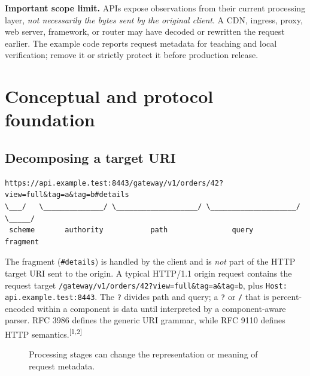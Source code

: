 \documentclass[10pt,letterpaper,oneside]{article}
\newcommand{\refs}[1]{\textsuperscript{\color{blue}[#1]}}
\newcommand{\code}[1]{\texttt{#1}}
\begin{document}
\begin{riskbox}
\textbf{Important scope limit.} APIs expose observations from their current processing layer, \emph{not necessarily the bytes sent by the original client}. A CDN, ingress, proxy, web server, framework, or router may have decoded or rewritten the request earlier. The example code reports request metadata for teaching and local verification; remove it or strictly protect it before production release.
\end{riskbox}
\clearpage
{}
\section{Conceptual and protocol foundation}
\subsection{Decomposing a target URI}
\begin{lstlisting}[language=Plain]
https://api.example.test:8443/gateway/v1/orders/42?view=full&tag=a&tag=b#details
\___/   \______________/ \___________________/ \____________________/ \_____/
 scheme       authority           path               query         fragment
\end{lstlisting}
The fragment (\code{\#details}) is handled by the client and is \emph{not} part of the HTTP target URI sent to the origin. A typical HTTP/1.1 origin request contains the request target \code{/gateway/v1/orders/42?view=full\&tag=a\&tag=b}, plus \code{Host: api.example.test:8443}. The \code{?} divides path and query; a \code{?} or \code{/} that is percent-encoded within a component is data until interpreted by a component-aware parser. RFC 3986 defines the generic URI grammar, while RFC 9110 defines HTTP semantics.\refs{1,2}

\begin{figure}[h!]
\centering
{}
\caption{Processing stages can change the representation or meaning of request metadata.}
\end{figure}
\end{document}

